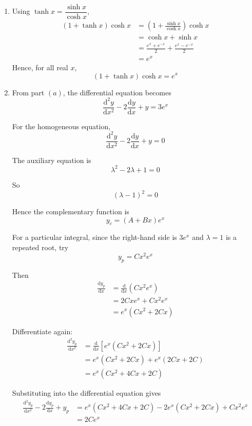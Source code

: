 \documentclass[leqno]{article}
\begin{document}
\begin{enumerate}[
  label=\textbf{\arabic*.},
  leftmargin=*,
  topsep=0pt,
  partopsep=0pt,
  parsep=0pt
]
\vspace*{30pt}

\begin{tcolorbox}[colback=white, colframe=scarlet, title={\textbf{Solution}}, breakable, grow to left by=6mm, grow to right by=10mm]
\begin{enumerate}[label=\textbf{(\alph*)}]
  \item Using \(\tanh x=\dfrac{\sinh x}{\cosh x}\),
\begin{align*}
(1+\tanh x)\cosh x
&=\left(1+\frac{\sinh x}{\cosh x}\right)\cosh x \\
&=\cosh x+\sinh x \\
&=\frac{e^x+e^{-x}}{2}+\frac{e^x-e^{-x}}{2} \\
&=e^x
\end{align*}
Hence, for all real \(x\),
\[
(1+\tanh x)\cosh x=e^x
\]

\item From part \((a)\), the differential equation becomes
\[
\frac{\mathrm{d}^2 y}{\mathrm{d}x^2}-2\frac{\mathrm{d}y}{\mathrm{d}x}+y=3e^x
\]

For the homogeneous equation,
\[
\frac{\mathrm{d}^2 y}{\mathrm{d}x^2}-2\frac{\mathrm{d}y}{\mathrm{d}x}+y=0
\]

The auxiliary equation is
\[
\lambda^2-2\lambda+1=0
\]

So
\[
(\lambda-1)^2=0
\]

Hence the complementary function is
\[
y_c=(A+Bx)e^x
\]

For a particular integral, since the right-hand side is $3e^x$ and $\lambda=1$ is a repeated root, try
\[
y_p=Cx^2e^x
\]

Then
\begin{align*}
\frac{\mathrm{d}y_p}{\mathrm{d}x}
&= \frac{\mathrm{d}}{\mathrm{d}x}\left(Cx^2e^x\right) \\
&= 2Cxe^x+Cx^2e^x \\
&= e^x\left(Cx^2+2Cx\right)
\end{align*}

Differentiate again:
\begin{align*}
\frac{\mathrm{d}^2y_p}{\mathrm{d}x^2}
&= \frac{\mathrm{d}}{\mathrm{d}x}\left[e^x\left(Cx^2+2Cx\right)\right] \\
&= e^x\left(Cx^2+2Cx\right)+e^x\left(2Cx+2C\right) \\
&= e^x\left(Cx^2+4Cx+2C\right)
\end{align*}

Substituting into the differential equation gives
\begin{align*}
\frac{\mathrm{d}^2y_p}{\mathrm{d}x^2}-2\frac{\mathrm{d}y_p}{\mathrm{d}x}+y_p
&= e^x\left(Cx^2+4Cx+2C\right)-2e^x\left(Cx^2+2Cx\right)+Cx^2e^x \\
&= 2Ce^x
\end{align*}


\end{enumerate}
\end{tcolorbox}
\end{enumerate}
\end{document}
